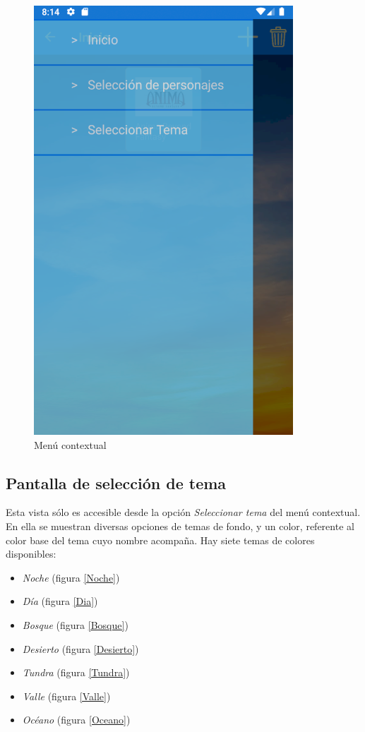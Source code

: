 \begin{figure}[H]
    \centering
    \includegraphics[scale=0.3]{Figures/Capturas/MenuContextual.png}
    \caption{Menú contextual}
    \label{MenuContextual}    
\end{figure}

\subsection{Pantalla de selección de tema}
Esta vista sólo es accesible desde la opción \textit{Seleccionar tema} del menú contextual.
En ella se muestran diversas opciones de temas de fondo, y un color, referente al color base del tema cuyo nombre acompaña.
Hay siete temas de colores disponibles: 
\begin{itemize}
    \item \textit{Noche} (figura \ref*{Noche})
    \item \textit{Día} (figura \ref*{Dia})
    \item \textit{Bosque} (figura \ref*{Bosque})
    \item \textit{Desierto} (figura \ref*{Desierto})
    \item \textit{Tundra} (figura \ref*{Tundra})
    \item \textit{Valle} (figura \ref*{Valle})
    \item \textit{Océano} (figura \ref*{Oceano})
\end{itemize}

